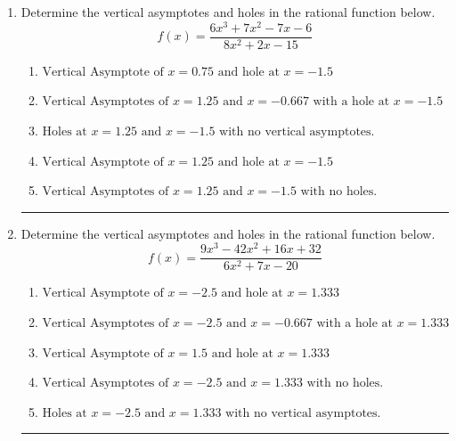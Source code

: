 \documentclass[14pt]{extbook}
\newcommand{\litem}[1]{\item#1\hspace*{-1cm}\rule{\textwidth}{0.4pt}}
\begin{document}
\begin{enumerate}
\litem{
Determine the vertical asymptotes and holes in the rational function below.\[ f(x) = \frac{6x^{3} +7 x^{2} -7 x -6}{8x^{2} +2 x -15} \]\begin{enumerate}[label=\Alph*.]
\item \( \text{Vertical Asymptote of } x = 0.75 \text{ and hole at } x = -1.5 \)
\item \( \text{Vertical Asymptotes of } x = 1.25 \text{ and } x = -0.667 \text{ with a hole at } x = -1.5 \)
\item \( \text{Holes at } x = 1.25 \text{ and } x = -1.5 \text{ with no vertical asymptotes.} \)
\item \( \text{Vertical Asymptote of } x = 1.25 \text{ and hole at } x = -1.5 \)
\item \( \text{Vertical Asymptotes of } x = 1.25 \text{ and } x = -1.5 \text{ with no holes.} \)

\end{enumerate} }
\litem{
Determine the vertical asymptotes and holes in the rational function below.\[ f(x) = \frac{9x^{3} -42 x^{2} +16 x + 32}{6x^{2} +7 x -20} \]\begin{enumerate}[label=\Alph*.]
\item \( \text{Vertical Asymptote of } x = -2.5 \text{ and hole at } x = 1.333 \)
\item \( \text{Vertical Asymptotes of } x = -2.5 \text{ and } x = -0.667 \text{ with a hole at } x = 1.333 \)
\item \( \text{Vertical Asymptote of } x = 1.5 \text{ and hole at } x = 1.333 \)
\item \( \text{Vertical Asymptotes of } x = -2.5 \text{ and } x = 1.333 \text{ with no holes.} \)
\item \( \text{Holes at } x = -2.5 \text{ and } x = 1.333 \text{ with no vertical asymptotes.} \)


\end{enumerate}}
\end{enumerate}
\end{document}
